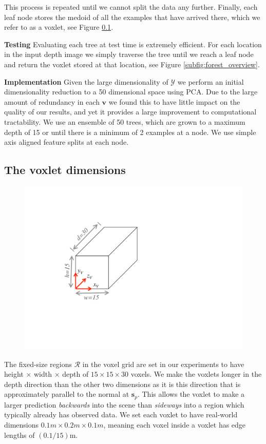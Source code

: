 \documentclass[10pt,twocolumn,letterpaper]{article}
\newcommand{\pixelidx}{\mathbf{s}}
\newcommand{\note}[1]{\textcolor{blue}{NOTE: #1}}
\renewcommand{\paragraph}{\vspace{2pt}\noindent\textbf}
\begin{document}
This process is repeated until we cannot split the data any further. 
Finally, each leaf node stores the medoid of all the examples that have arrived there, which we refer to as a voxlet, see Figure \ref{}.


\paragraph{Testing} 
Evaluating each tree at test time is extremely efficient. 
For each location in the input depth image we simply traverse the tree until we reach a leaf node and return the voxlet stored at that location, see Figure \ref{subfig:forest_overview}. 

\paragraph{Implementation} 
Given the large dimensionality of $\mathcal{Y}$ we perform an initial dimensionality reduction to a 50 dimensional space using PCA.
Due to the large amount of redundancy in each $\mathbf{v}$ we found this to have little impact on the quality of our results, and yet it provides a large improvement to computational tractability.
We use an ensemble of 50 trees, which are grown to a maximum depth of 15 or until there is a minimum of 2 examples at a node. 
We use simple axis aligned feature splits at each node.



\subsection{The voxlet dimensions}
\begin{figure}
  \vspace{-20pt}
  \centering
    \includegraphics[width=0.35\columnwidth, clip=true, trim=120 140 340 80]{single_voxlet}
    \vspace{-15pt}
  \caption{}%
    \label{fig:voxlet_dims}
\end{figure}
The fixed-size regions $\mathcal{R}$ in the voxel grid are set in our experiments to have height $\times$ width $\times$ depth of $15 \times 15 \times 30$ voxels.
We make the voxlets longer in the depth direction than the other two dimensions as it is this direction that is approximately parallel to the normal at $\pixelidx_p$.
This allows the voxlet to make a larger prediction \emph{backwards} into the scene than \emph{sideways} into a region which typically already has observed data.
We set each voxlet to have real-world dimensions $0.1m \times 0.2m \times 0.1m$, meaning each voxel inside a voxlet has edge lengths of $(0.1 / 15)$m.
\end{document}

